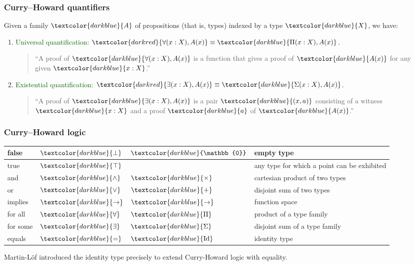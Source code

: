 \documentclass[aspectratio=169]{beamer}
\newcommand{\eqq}{\equiv}
\newcommand{\db}{\textcolor{darkblue}}
\newcommand{\dg}{\textcolor{darkgreen}}
\newcommand{\dr}{\textcolor{darkred}}
\newcommand{\m}[1]{$\db{#1}$}
\newcommand{\mm}[1]{${#1}$}
\newcommand{\Id}{\operatorname{Id}}
\begin{document}
\begin{frame}
  \frametitle{Curry--Howard quantifiers}

Given a family \m{A} of propositions (that is, types) indexed by a type \m{X}, we have:
\begin{enumerate}
\vfill \item \dg{Universal quantification:} \quad \mm{\dr{\forall(x:X), A(x)} \eqq \db{\Pi(x:X), A(x)}}.

\vfill

\begin{quote}
  ``A proof of \m{\forall(x:X), A(x)} is a function that gives a proof of \m{A(x)} for any given \m{x:X}.''
\end{quote}


\vfill \item \dg{Existential quantification:} \quad \mm{\dr{\exists(x:X), A(x)} \eqq \db{\Sigma(x:X), A(x)}}.

\vfill

\begin{quote}
  ``A proof of \m{\exists(x:X), A(x)} is a pair \m{(x,a)}  consisting of a witness \m{x:X} and a proof \m{a} of \m{A(x)}.''
\end{quote}

\end{enumerate}

\end{frame}

\begin{frame}
  \frametitle{Curry--Howard logic}

  \begin{tabular}{|| l | l | l | l ||}
    \hline \hline
    false &  \m{\bot}         & \m{\mathbb{0}}  & empty type \\ \hline
    true &  \m{\top}        & \  & any type for which a point can be exhibited \\ \hline
    and &  \m{\wedge} & \m{\times} & cartesian product of two types \\ \hline
    or &  \m{\vee} & \m{+} & disjoint sum of two types \\ \hline
    implies  & \m{\to} & \m{\to} & function space \\ \hline
    for all  & \m{\forall} & \m{\Pi} & product of a type family \\ \hline
    for some &  \m{\exists} & \m{\Sigma} & disjoint sum of a type family \\ \hline
equals & \m{=} & \m{\Id} & identity type \\ \hline 
    \hline
  \end{tabular}

\vfill

Martin-L\"of introduced the identity type precisely to extend
Curry-Howard logic with equality.

\end{frame}
\end{document}
